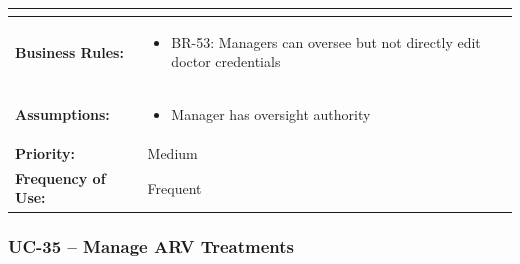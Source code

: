 \documentclass[12pt,a4paper]{article}
\begin{document}
\begin{longtable}{|p{4.5cm}|p{10.5cm}|}
\begin{itemize}
\end{itemize} \\
\hline
\textbf{Business Rules:} &
\begin{itemize}
  \item BR-53: Managers can oversee but not directly edit doctor credentials
\end{itemize} \\
\hline
\textbf{Assumptions:} &
\begin{itemize}
  \item Manager has oversight authority
\end{itemize} \\
\hline
\textbf{Priority:} & Medium \\
\hline
\textbf{Frequency of Use:} & Frequent \\
\hline
\end{longtable}

\subsubsection{UC-35 – Manage ARV Treatments}
\end{document}
